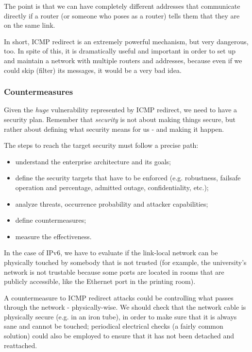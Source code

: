 The point is that we can have completely different addresses that communicate directly if a router (or someone who poses as a router) tells them that they are on the same link.

In short, ICMP redirect is an extremely powerful mechanism, but very dangerous, too. In spite of this, it is dramatically useful and important in order to set up and maintain a network with multiple routers and addresses, because even if we could skip (filter) its messages, it would be a very bad idea.


\subsubsection{Countermeasures}
Given the \textit{huge} vulnerability represented by ICMP redirect, we need to have a security plan. Remember that \textit{security} is not about making things secure, but rather about defining what security means for us - and making it happen.

The steps to reach the target security must follow a precise path:
\begin{itemize}
    \item understand the enterprise architecture and its goals;
    \item define the security targets that have to be enforced (e.g. robustness, failsafe operation and percentage, admitted outage, confidentiality, etc.);
    \item analyze threats, occurrence probability and attacker capabilities;
    \item define countermeasures;
    \item measure the effectiveness.
\end{itemize}

In the case of IPv6, we have to evaluate if the link-local network can be physically touched by somebody that is not trusted (for example, the university's network is not trustable because some ports are located in rooms that are publicly accessible, like the Ethernet port in the printing room).

A countermeasure to ICMP redirect attacks could be controlling what passes through the network - physically-wise. We should check that the network cable is physically secure (e.g. in an iron tube), in order to make sure that it is always sane and cannot be touched; periodical electrical checks (a fairly common solution) could also be employed to ensure that it has not been detached and reattached.

